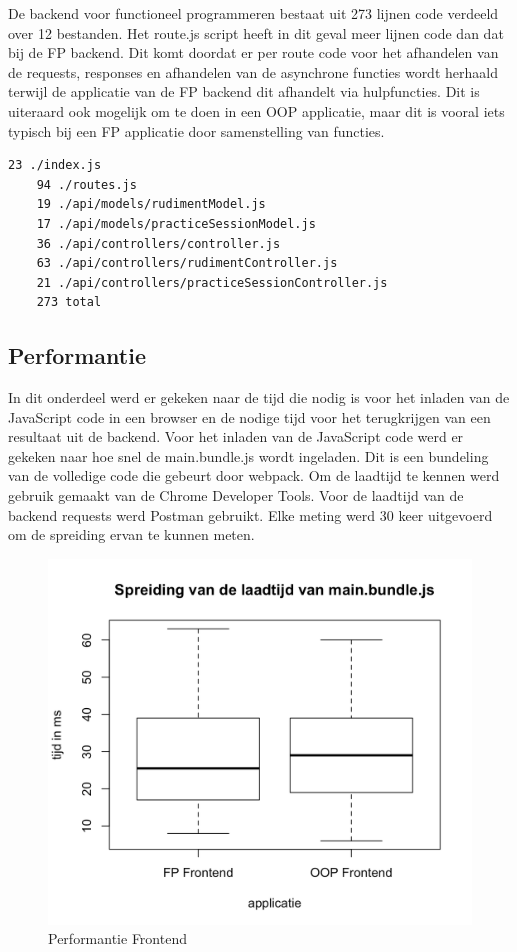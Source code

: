 De backend voor functioneel programmeren bestaat uit 273 lijnen code verdeeld over 12 bestanden. Het route.js script heeft in dit geval meer lijnen code dan dat bij de FP backend. Dit komt doordat er per route code voor het afhandelen van de requests, responses en afhandelen van de asynchrone functies wordt herhaald terwijl de applicatie van de FP backend dit afhandelt via hulpfuncties. Dit is uiteraard ook mogelijk om te doen in een OOP applicatie, maar dit is vooral iets typisch bij een FP applicatie door samenstelling van functies.

 \begin{lstlisting}[caption=OOP backend aantal code]
    23 ./index.js
    94 ./routes.js
    19 ./api/models/rudimentModel.js
    17 ./api/models/practiceSessionModel.js
    36 ./api/controllers/controller.js
    63 ./api/controllers/rudimentController.js
    21 ./api/controllers/practiceSessionController.js
    273 total
 \end{lstlisting}

 \subsection{Performantie}
In dit onderdeel werd er gekeken naar de tijd die nodig is voor het inladen van de JavaScript code in een browser en de nodige tijd voor het terugkrijgen van een resultaat uit de backend. Voor het inladen van de JavaScript code werd er gekeken naar hoe snel de main.bundle.js wordt ingeladen. Dit is een bundeling van de volledige code die gebeurt door webpack. Om de laadtijd te kennen werd gebruik gemaakt van de Chrome Developer Tools. Voor de laadtijd van de backend requests werd Postman gebruikt. Elke meting werd 30 keer uitgevoerd om de spreiding ervan te kunnen meten.

\begin{figure}
    \includegraphics[width=\linewidth]{img/performantie-frontend.png}
    \caption{Performantie Frontend}
    \label{fig:performantiebackend}
  \end{figure}

